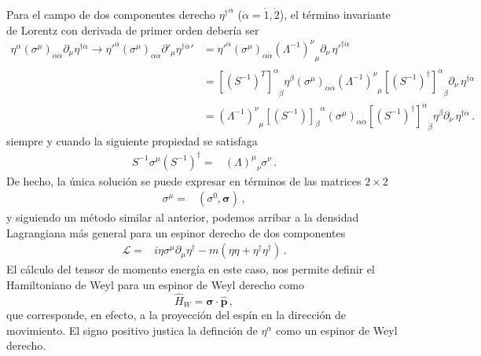 \begin{frame}
Para el campo de dos componentes derecho  ${\eta^{\dagger}}^{\dot{\alpha}}$ ($\dot{\alpha}=\dot{1},\dot{2}$), el término invariante de Lorentz con derivada de primer orden debería ser
 \begin{align}
   {\eta}^{\alpha}\left( \sigma^{\mu} \right)_{\alpha\dot{\alpha}}\partial_\mu\eta^{\dagger\dot{\alpha}}\to  {\eta'}^{\alpha}\left(\sigma^\mu\right)_{\alpha\dot{\alpha}}\partial'_\mu{\eta^{\dagger \dot{\alpha}}}'
&={\eta'}^{\alpha}\left( \sigma^\mu \right)_{\alpha\dot{\alpha}}{\left(\Lambda^{-1}\right)^\nu}_\mu\partial_\nu \,{\eta'}^{\dagger\dot{\alpha}}\nonumber\\
&={\left[ \left( S^{-1} \right)^T \right]^{\alpha}}_{\beta}{\eta}^{\beta}\left( \sigma^\mu \right)_{\alpha\dot{\alpha}}{\left(\Lambda^{-1}\right)^\nu}_\mu {\left[ \left( S^{-1} \right)^\dagger \right]^{\dot{\alpha}}}_{\dot{\beta}}\partial_\nu \,{\eta}^{\dagger\dot{\alpha}}\nonumber\\
&={\left(\Lambda^{-1}\right)^\nu}_\mu{\left[ \left( S^{-1} \right) \right]_{\beta}}^{\alpha}\left( \sigma^\mu \right)_{\alpha\dot{\alpha}}{\left[ \left( S^{-1} \right)^\dagger \right]^{\dot{\alpha}}}_{\dot{\beta}} {\eta}^{\beta}\partial_\nu \,{\eta}^{\dagger\dot{\alpha}}\,.
\end{align}
siempre y cuando la siguiente propiedad se satisfaga
\begin{align}
\label{eq:ltrincond}
S^{-1}\sigma^\mu \left( S^{-1} \right)^{\dagger}=&{\left(\Lambda\right)^\mu}_\nu \sigma^\nu\,.
\end{align}
De hecho, la única solución se puede expresar en términos de las matrices $2\times2$
   \begin{align} 
 {\sigma}^{\mu} =& \left( \sigma^0,{\boldsymbol{\sigma}} \right)\,, 
\end{align}
y siguiendo un método similar al anterior, podemos arribar a la densidad Lagrangiana más general para un espinor derecho de dos componentes
\begin{align}
  \mathcal{L}=&i{\eta}{\sigma}^\mu\partial_\mu\eta^{\dagger}-
m \left( \eta\eta+\eta^{\dagger}\eta^{\dagger} \right)\,.
\end{align}
El cálculo del tensor de momento energía en este caso, nos permite  definir el Hamiltoniano de Weyl para un espinor de Weyl derecho como
\begin{equation}
  \label{eq:denshal}
  \hat{H}_W= \boldsymbol{\sigma}\cdot\widehat{\boldsymbol{p}}\,,
\end{equation}
que corresponde, en efecto, a la proyección del espín en la dirección de movimiento. El signo positivo justica la definción de $\eta^{\dot{\alpha}}$ como un espinor de Weyl derecho.
\end{frame}



